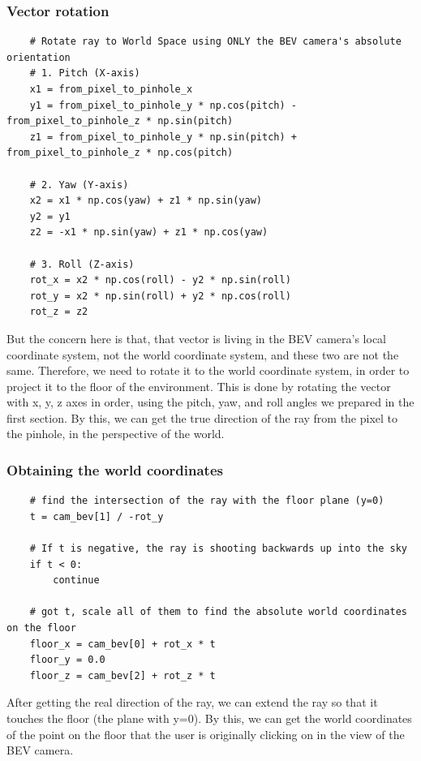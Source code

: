 \documentclass{article}
\begin{document}
\subsubsection{Vector rotation}
\begin{verbatim}
    # Rotate ray to World Space using ONLY the BEV camera's absolute orientation 
    # 1. Pitch (X-axis)
    x1 = from_pixel_to_pinhole_x
    y1 = from_pixel_to_pinhole_y * np.cos(pitch) - from_pixel_to_pinhole_z * np.sin(pitch)
    z1 = from_pixel_to_pinhole_y * np.sin(pitch) + from_pixel_to_pinhole_z * np.cos(pitch)

    # 2. Yaw (Y-axis)
    x2 = x1 * np.cos(yaw) + z1 * np.sin(yaw)
    y2 = y1
    z2 = -x1 * np.sin(yaw) + z1 * np.cos(yaw)

    # 3. Roll (Z-axis)
    rot_x = x2 * np.cos(roll) - y2 * np.sin(roll)
    rot_y = x2 * np.sin(roll) + y2 * np.cos(roll)
    rot_z = z2
\end{verbatim}
But the concern here is that, that vector is living in the BEV camera's local coordinate system, 
not the world coordinate system, and these two are not the same. 
Therefore, we need to rotate it to the world coordinate system, in order to project it to the 
floor of the environment. This is done by rotating the vector with x, y, z axes in order, using 
the pitch, yaw, and roll angles we prepared in the first section. By this, we can get the true 
direction of the ray from the pixel to the pinhole, in the perspective of the world.

\subsubsection{Obtaining the world coordinates}
\begin{verbatim}
    # find the intersection of the ray with the floor plane (y=0)
    t = cam_bev[1] / -rot_y
    
    # If t is negative, the ray is shooting backwards up into the sky
    if t < 0:
        continue
    
    # got t, scale all of them to find the absolute world coordinates on the floor
    floor_x = cam_bev[0] + rot_x * t
    floor_y = 0.0
    floor_z = cam_bev[2] + rot_z * t
\end{verbatim}
After getting the real direction of the ray, we can extend the ray so that it touches 
the floor (the plane with y=0). By this, we can get the world coordinates of the point on 
the floor that the user is originally clicking on in the view of the BEV camera.
\end{document}
